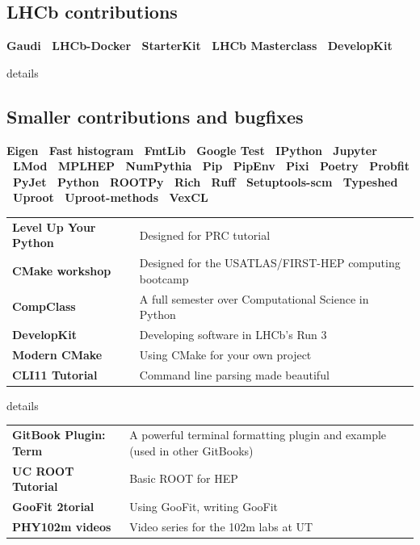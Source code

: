 \documentclass[10pt,letterpaper]{moderncv}
\begin{document}
\subsection{LHCb contributions}
\textbf{%
    Gaudi \textbullet\
    LHCb-Docker \textbullet\
    StarterKit \textbullet\
    LHCb Masterclass \textbullet\
    DevelopKit
}


\begin{taggedblock}{details}
\subsection{Smaller contributions and bugfixes}
\textbf{%
    Eigen \textbullet\
    Fast histogram \textbullet\
    FmtLib \textbullet\
    Google Test \textbullet\
    IPython \textbullet\
    Jupyter \textbullet\
    LMod \textbullet\
    MPLHEP \textbullet\
    NumPythia \textbullet\
    Pip \textbullet\
    PipEnv \textbullet\
    Pixi \textbullet\
    Poetry \textbullet\
    Probfit \textbullet\
    PyJet \textbullet\
    Python \textbullet\
    ROOTPy \textbullet\
    Rich \textbullet\
    Ruff \textbullet\
    Setuptools-scm \textbullet\
    Typeshed \textbullet\
    Uproot \textbullet\
    Uproot-methods \textbullet\
    VexCL
}
\end{taggedblock}


\mysection{Other writings}

\begin{tabularx}{\textwidth}{>{\bfseries}p{1.6in}>{\raggedright\arraybackslash}X}
Level Up Your Python & Designed for PRC tutorial \\
CMake workshop & Designed for the USATLAS/FIRST-HEP computing bootcamp \\
CompClass & A full semester over Computational Science in Python \\
DevelopKit & Developing software in LHCb's Run 3 \\
Modern CMake & Using CMake for your own project \\
CLI11 Tutorial & Command line parsing made beautiful \\
\end{tabularx}

\begin{taggedblock}{details}
\begin{tabularx}{\textwidth}{>{\bfseries}p{1.6in}>{\raggedright\arraybackslash}X}
GitBook Plugin: Term & A powerful terminal formatting plugin and example (used in other GitBooks) \\
UC ROOT Tutorial & Basic ROOT for HEP \\
GooFit 2torial & Using GooFit, writing GooFit \\
PHY102m videos & Video series for the 102m labs at UT \\
\end{tabularx}
\end{taggedblock}
\end{document}
